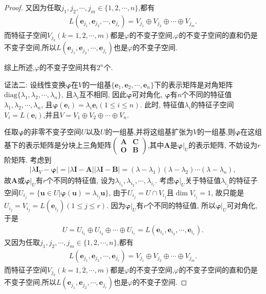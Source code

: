 \documentclass[../../main.tex]{subfiles}
\begin{document}
\begin{proof}
又因为任取$j_1,j_2,\cdots,j_m\in\{1,2,\cdots,n\}$,都有
\begin{align*}
L(\boldsymbol{e}_{j_1},\boldsymbol{e}_{j_2},\cdots ,\boldsymbol{e}_{j_r})=V_{j_1}\oplus V_{j_2}\oplus \cdots \oplus V_{j_m}.
\end{align*}
而特征子空间$V_{j_k}(k=1,2,\cdots,m)$都是\(\varphi\)的不变子空间,\(\varphi\)的不变子空间的直和仍是不变子空间,所以$L(\boldsymbol{e}_{j_1},\boldsymbol{e}_{j_2},\cdots ,\boldsymbol{e}_{j_r})$也是\(\varphi\)的不变子空间.

综上所述,\(\varphi\)的不变子空间共有\(2^n\)个.

{\color{blue}证法二:}
设线性变换\(\boldsymbol{\varphi}\)在\(V\)的一组基\(\{\boldsymbol{e}_1,\boldsymbol{e}_2,\cdots,\boldsymbol{e}_n\}\)下的表示矩阵是对角矩阵\(\mathrm{diag}\{\lambda_1,\lambda_2,\cdots,\lambda_n\}\), 且\(\lambda_i\)互不相同, 因此\(\boldsymbol{\varphi}\)可对角化, \(\boldsymbol{\varphi}\)有\(n\)个不同的特征值\(\lambda_1,\lambda_2,\cdots,\lambda_n\), 且\(\boldsymbol{\varphi}(\boldsymbol{e}_i) = \lambda_i\boldsymbol{e}_i(1\leq i\leq n)\). 此时, 特征值\(\lambda_i\)的特征子空间\(V_i = L(\boldsymbol{e}_i)\),并且\(V = V_1\oplus V_2\oplus\cdots\oplus V_n\). 

任取\(\boldsymbol{\varphi}\)的非零不变子空间\(U\)以及\(U\)的一组基,并将这组基扩张为\(V\)的一组基,则\(\boldsymbol{\varphi}\)在这组基下的表示矩阵是分块上三角矩阵\(\begin{pmatrix}
\boldsymbol{A}&\boldsymbol{C}\\
\boldsymbol{O}&\boldsymbol{B}
\end{pmatrix}\),其中\(\boldsymbol{A}\)是\(\boldsymbol{\varphi}|_U\)的表示矩阵, 不妨设为\(r\)阶矩阵. 考虑到
\begin{align*}
|\lambda\boldsymbol{I}_V - \boldsymbol{\varphi}| = |\lambda\boldsymbol{I} - \boldsymbol{A}||\lambda\boldsymbol{I} - \boldsymbol{B}| = (\lambda - \lambda_1)(\lambda - \lambda_2)\cdots(\lambda - \lambda_n),
\end{align*}
故\(\boldsymbol{A}\)或\(\boldsymbol{\varphi}|_U\)有\(r\)个不同的特征值, 设为\(\lambda_{i_1},\lambda_{i_2},\cdots,\lambda_{i_r}\). 考虑\(\boldsymbol{\varphi}|_U\)关于特征值\(\lambda_{i_j}\)的特征子空间\(U_{i_j} = \{\boldsymbol{u}\in U|\boldsymbol{\varphi}(\boldsymbol{u}) = \lambda_{i_j}\boldsymbol{u}\}\), 由于\(U_{i_j} = U\cap V_{i_j}\)且\(\dim V_{i_j} = 1\), 故只能是\(U_{i_j} = V_{i_j} = L(\boldsymbol{e}_{i_j})(1\leq j\leq r)\). 因为\(\boldsymbol{\varphi}|_U\)有\(r\)个不同的特征值, 所以\(\boldsymbol{\varphi}|_U\)可对角化, 于是
\begin{align*}
U = U_{i_1}\oplus U_{i_2}\oplus\cdots\oplus U_{i_r} = L(\boldsymbol{e}_{i_1},\boldsymbol{e}_{i_2},\cdots,\boldsymbol{e}_{i_r}).
\end{align*}
又因为任取$j_1,j_2,\cdots,j_m\in\{1,2,\cdots,n\}$,都有
\begin{align*}
L(\boldsymbol{e}_{j_1},\boldsymbol{e}_{j_2},\cdots ,\boldsymbol{e}_{j_r})=V_{j_1}\oplus V_{j_2}\oplus \cdots \oplus V_{j_m}.
\end{align*}
而特征子空间$V_{j_k}(k=1,2,\cdots,m)$都是\(\varphi\)的不变子空间,\(\varphi\)的不变子空间的直和仍是不变子空间,所以$L(\boldsymbol{e}_{j_1},\boldsymbol{e}_{j_2},\cdots ,\boldsymbol{e}_{j_r})$也是\(\varphi\)的不变子空间.


\end{proof}
\end{document}
